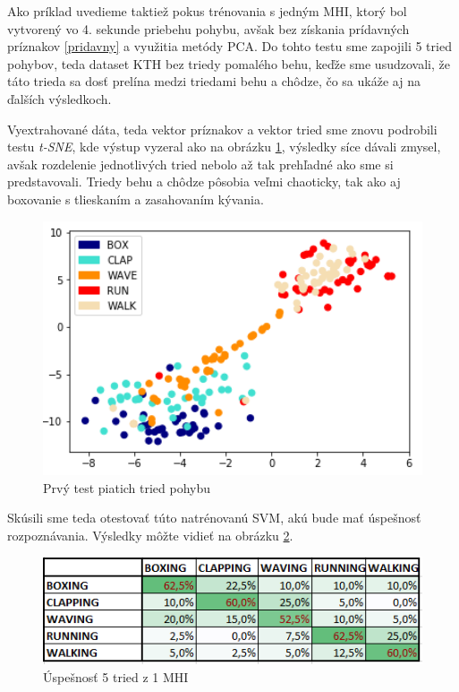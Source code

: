 Ako príklad uvedieme taktiež pokus trénovania s jedným MHI, ktorý bol vytvorený vo 4. sekunde priebehu pohybu, avšak bez získania prídavných príznakov \ref{pridavny} a využitia metódy PCA.  Do tohto testu sme zapojili 5 tried pohybov, teda dataset KTH bez triedy pomalého behu, keďže sme usudzovali, že táto trieda sa dosť prelína medzi triedami behu a chôdze, čo sa ukáže aj na ďalších výsledkoch. 

Vyextrahované dáta, teda vektor príznakov a vektor tried sme znovu podrobili testu \textit{t-SNE}, kde výstup vyzeral ako na obrázku \ref{Test5Class1}, výsledky síce dávali zmysel, avšak rozdelenie jednotlivých tried nebolo až tak prehľadné ako sme si predstavovali. Triedy behu a chôdze pôsobia veľmi chaoticky, tak ako aj boxovanie s tlieskaním a zasahovaním kývania.

\begin{figure}[H]
  \centering
  \includegraphics[width=14cm]{img/test5classes1.png}
  \caption{Prvý test piatich tried pohybu}
  \label{Test5Class1}
\end{figure}

Skúsili sme teda otestovať túto natrénovanú SVM, akú bude mať úspešnosť rozpoznávania. Výsledky môžte vidieť na obrázku \ref{Test5Class1g}.


\begin{figure}[H]
  \centering
  \includegraphics[width=14cm]{img/test5classes1tab.png}
  \caption{Úspešnosť 5 tried z 1 MHI}
  \label{Test5Class1g}
\end{figure}

